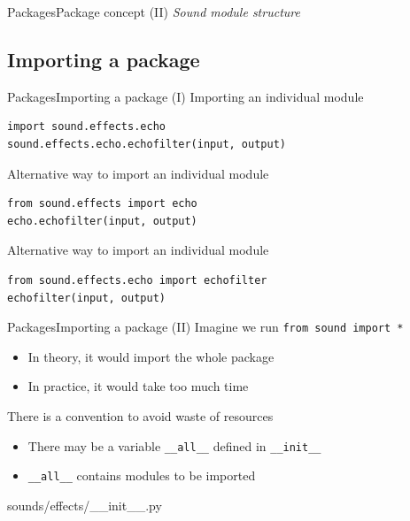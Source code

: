 \documentclass[10pt,compress]{beamer} %
\begin{document}
\begin{frame}{Packages}{Package concept (II)}
	\centering \textit{Sound module structure}
	
\end{frame}

\subsection{Importing a package}
\begin{frame}[fragile]{Packages}{Importing a package (I)}
	Importing an individual module
	\begin{verbatim}
import sound.effects.echo
sound.effects.echo.echofilter(input, output)
\end{verbatim}

	Alternative way to import an individual module
	\begin{verbatim}
from sound.effects import echo
echo.echofilter(input, output)
\end{verbatim}

	Alternative way to import an individual module
	\begin{verbatim}
from sound.effects.echo import echofilter
echofilter(input, output)
\end{verbatim}

\end{frame}

\begin{frame}{Packages}{Importing a package (II)}
	Imagine we run \texttt{from sound import *}
		\begin{itemize}
		\item In theory, it would import the whole package
		\item In practice, it would take too much time
		\end{itemize}
	There is a convention to avoid waste of resources
		\begin{itemize}
		\item There may be a variable \texttt{\_\_all\_\_} defined in \texttt{\_\_init\_\_}
		\item \texttt{\_\_all\_\_} contains modules to be imported
		\end{itemize}

	\begin{exampleblock}{sounds/effects/\_\_init\_\_.py}
	\vspace{-0.2cm}
	
	\vspace{-0.2cm}
	\end{exampleblock}
\end{frame}
\end{document}
